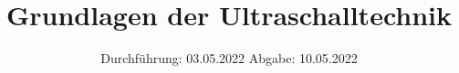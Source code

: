 

\subject{US 1}
\title{Grundlagen der Ultraschalltechnik}
\date{%
  Durchführung: 03.05.2022
  \hspace{3em}
  Abgabe: 10.05.2022
}



\maketitle
\thispagestyle{empty}
\tableofcontents
\newpage






\printbibliography{}




